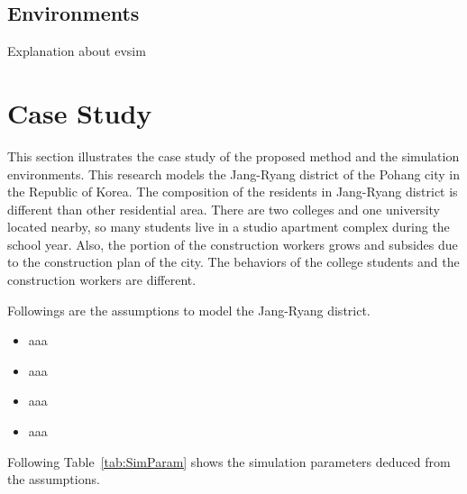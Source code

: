 \documentclass{scsSimAUDPaperFormat}
\begin{document}
\subsection{Environments}


Explanation about evsim

\section{Case Study}
This section illustrates the case study of the proposed method and the simulation environments. This research models the Jang-Ryang district of the Pohang city in the Republic of Korea. The composition of the residents in Jang-Ryang district is different than other residential area. There are two colleges and one university located nearby, so many students live in a studio apartment complex during the school year. Also, the portion of the construction workers grows and subsides due to the construction plan of the city. The behaviors of the college students and the construction workers are different. 

Followings are the assumptions to model the Jang-Ryang district.
\begin{itemize}
    \item aaa
    \item aaa
    \item aaa
    \item aaa
\end{itemize}

Following Table~\ref{tab:SimParam} shows the simulation parameters deduced from the assumptions.

\end{document}
